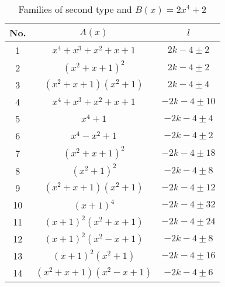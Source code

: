 \documentclass{amsart}
\begin{document}
\begin{table}[ht]
\caption{Families of second type and $B(x)=2x^4+2$}
\centering
\begin{tabular}{|c |c |c |}
\hline
No. & $A(x)$ & $l$ \\
\hline
1 & $x^4+x^3+x^2+x+1$ & $2k-4\pm2$ \\
2 & $(x^2+x+1)^2$ & $2k-4\pm2$\\
3 & $(x^2+x+1)(x^2+1)$ & $2k-4\pm4$\\

4 & $x^4+x^3+x^2+x+1$ & $-2k-4\pm10$\\
5 & $x^4+1$ & $-2k-4\pm4$\\
6 & $x^4-x^2+1$ & $-2k-4\pm2$\\
7 & $(x^2+x+1)^2$ & $-2k-4\pm18$\\
8 & $(x^2+1)^2$ & $-2k-4\pm8$\\
9 & $(x^2+x+1)(x^2+1)$ & $-2k-4\pm12$\\
10 & $(x+1)^4$ & $-2k-4\pm32$\\
11 & $(x+1)^2(x^2+x+1)$ & $-2k-4\pm24$\\
12 & $(x+1)^2(x^2-x+1)$ & $-2k-4\pm8$\\
13 & $(x+1)^2(x^2+1)$ & $-2k-4\pm16$\\
14 & $(x^2+x+1)(x^2-x+1)$ & $-2k-4\pm6$\\
\hline
\end{tabular}
\end{table}
\end{document}
